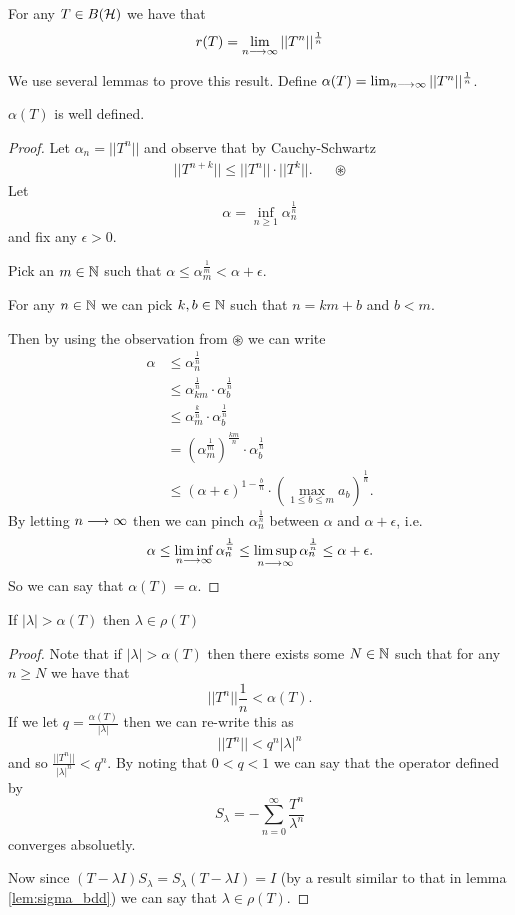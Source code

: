 \documentclass{unswmaths}
\begin{document}
\begin{theorem}
	\label{thm:spec_rad}
	For any $ T \in B(\mathcal{H}) $ we have that 
	$$
		r(T) = \lim_{n \longrightarrow \infty} ||T^n||^\frac{1}{n}
	$$
\end{theorem}
We use several lemmas to prove this result.
Define $ \alpha(T) = \lim_{n \longrightarrow \infty}  ||T^n ||^\frac{1}{n} $.
\begin{lemma}
	$ \alpha(T) $ is well defined.
\end{lemma}
\begin{proof}
	Let $ \alpha_n = ||T^n|| $ and observe that by Cauchy-Schwartz
	\begin{align*}
		||T^{n+k} || \leq ||T^n|| \cdot ||T^k||.	& & \circledast
	\end{align*}
	Let $$ \alpha = \inf_{n \geq 1} \alpha^\frac{1}{n}_n $$ and fix any $ \epsilon > 0 $.
	
	Pick an $ m \in \mathbb{N} $ such that $ \alpha\leq \alpha_m^\frac{1}{m}< \alpha + \epsilon $.
	
	For any $ n \in \mathbb{N} $ we can pick $ k, b \in \mathbb{N} $ such that $ n = km + b $ and $ b < m $.
	
	Then by using the observation from $ \circledast $ we can write 
	\begin{align*}
		\alpha &\leq \alpha_{n}^\frac{1}{n} \\
			&\leq \alpha_{km}^\frac{1}{n} \cdot \alpha_{b}^\frac{1}{n} \\
			&\leq \alpha_{m}^\frac{k}{n} \cdot \alpha_{b}^\frac{1}{n} \\
			&= \left(\alpha_m^\frac{1}{m} \right)^\frac{km}{n} \cdot \alpha_b^\frac{1}{n} \\
			&\leq (\alpha + \epsilon)^{1 - \frac{b}{n}} \cdot \left( \max_{1 \leq b \leq m} a_b\right)^\frac{1}{n}.
	\end{align*}
	By letting $ n \longrightarrow \infty $ then we can pinch $ \alpha_{n}^\frac{1}{n} $ between $ \alpha $ and $ \alpha + \epsilon $,
	i.e. 
	$$
		\alpha \leq \liminf_{n \longrightarrow \infty} \alpha_n^\frac{1}{n} \leq \limsup_{n \longrightarrow \infty} \alpha_n^\frac{1}{n} \leq \alpha + \epsilon.
	$$
	So we can say that $ \alpha(T) = \alpha $.
\end{proof}
\begin{lemma}
	\label{lem:lambda_alpha_rho}
	If $ |\lambda| > \alpha(T) $ then $ \lambda \in \rho(T) $
\end{lemma}
\begin{proof}
	Note that
	if $ | \lambda | > \alpha(T) $ then there exists some $ N \in \mathbb{N} $ such that for any $ n \geq N $ we have that
	$$ 
		|| T^n ||\frac{1}{n} < \alpha(T).
	$$
	If we let $ q = \frac{\alpha(T)}{|\lambda|} $  then we can re-write this as
	$$
		||T^n|| < q^n |\lambda|^n 
	$$
	and so $ \frac{||T^n||}{|\lambda|^n} < q^n $.
	By noting that $ 0 < q < 1 $ we can say that the operator defined by
	$$ S_\lambda = - \sum_{n=0}^\infty \frac{T^n}{\lambda^n} $$
	converges absoluetly.
	
	Now since $ (T-\lambda I) S_\lambda = S_\lambda (T - \lambda I) = I $ (by a result similar to that in lemma \ref{lem:sigma_bdd})
	we can say that $ \lambda \in \rho(T) $.
\end{proof}
\end{document}

